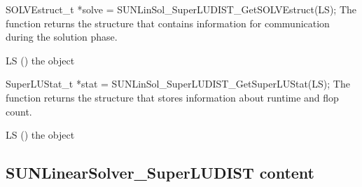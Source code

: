 {
  SOLVEstruct\_t *solve = SUNLinSol\_SuperLUDIST\_GetSOLVEstruct(LS);
}
{
  The function  returns the
  {\superludist} structure that contains information for communication
  during the solution phase.
}
{
  \begin{args}[LS]
  \item[LS] ()
    the {\sunlinsolsludist} object
  \end{args}
}
{
}
{
}

{
  SuperLUStat\_t *stat = SUNLinSol\_SuperLUDIST\_GetSuperLUStat(LS);
}
{
  The function  returns the
  {\superludist} structure that stores information about runtime and
  flop count.
}
{
  \begin{args}[LS]
  \item[LS] ()
    the {\sunlinsolsludist} object
  \end{args}
}
{
}
{
}


\subsection{SUNLinearSolver\_SuperLUDIST content}\label{ss:sunlinsol_sludist_content}


